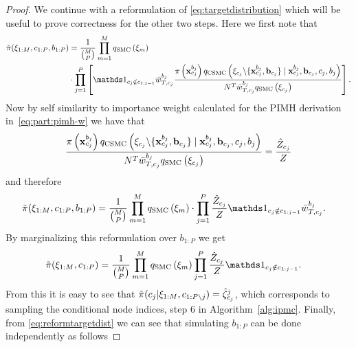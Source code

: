 \begin{proof}
	We continue with a reformulation of \eqref{eq:targetdistribution} which will be useful to prove correctness for the other two steps.
	Here we first note that
	\begin{align}
	\tilde \pi (\xib_{1:M},  c_{1:P}, b_{1:P})&=\frac{1}{\binom{M}{P}} \prod_{m=1}^M q_{\text{SMC}}\left(\xib_m\right) \nonumber\\ &\cdot
	\prod_{j = 1}^P \left[
	\iden_{c_j \notin c_{1:j-1}} \nw_{T,c_j}^{b_j}
	\frac{\pi\left(\xb_{c_j}^{b_j}\right) q_{\text{CSMC}}\left(\xib_{c_j} \backslash \{\xb_{c_j}^{b_j}, \bb_{c_j}\} \mid 
		\xb_{c_j}^{b_j}, \bb_{c_j}, c_j, b_j \right)}{N^{T} \nw_{T,c_j}^{b_j}q_{\text{SMC}}\left(\xib_{c_j}\right)}\right].
	\end{align}
	Now by self similarity to importance weight calculated for the PIMH derivation in~\eqref{eq:part:pimh-w} we have that
	\begin{align}
	\frac{\pi\left(\mathbf{x}_{c_j}^{b_j}\right) q_{\text{CSMC}}\left(\mathbf{\xi}_{c_j} \backslash \{\mathbf{x}_{c_j}^{b_j}, \mathbf{b}_{c_j}\} \mid 
		\mathbf{x}_{c_j}^{b_j}, \mathbf{b}_{c_j}, c_j, b_j \right)}{N^{T} \bar w_{T,c_j}^{b_j}q_{\text{SMC}}\left(\mathbf{\xi}_{c_j}\right)}
	= \frac{\hat Z_{c_j}}{Z}
	\end{align}
	and therefore
	\begin{align}
		\label{eq:reformtargetdist}
	\tilde \pi (\xib_{1:M},  c_{1:P}, b_{1:P}) &= \frac{1}{\binom{M}{P}} \prod_{m=1}^M q_{\text{SMC}}\left(\xib_m\right) \cdot \prod_{j = 1}^P \frac{\hat Z_{c_j}}{Z}\iden_{c_j \notin c_{1:j-1}} 
	\nw_{T,c_j}^{b_j}.
	\end{align}
	By marginalizing this reformulation over $b_{1:P}$ we get
	\begin{align*}
	\tilde\pi(\xib_{1:M}, c_{1:P}) 
	&= \frac{1}{\binom{M}{P}} \prod_{m=1}^M q_{\text{SMC}}\left(\xib_m\right) \prod_{j = 1}^P \frac{\hat Z_{c_j}}{Z}\iden_{c_j \notin c_{1:j-1}} .\nonumber
	\end{align*}
	From this it is easy to see that $\tilde\pi(c_j | \mathbf{\xi}_{1:M}, c_{1:P\backslash j}) = \hat{\zeta}_{c_j}^j$, which 
	corresponds to sampling the conditional node indices, \ie step 6 in Algorithm~\ref{alg:ipmc}. Finally, from \eqref{eq:reformtargetdist} we can see that simulating $b_{1:P}$ can be done independently as follows

\end{proof}
